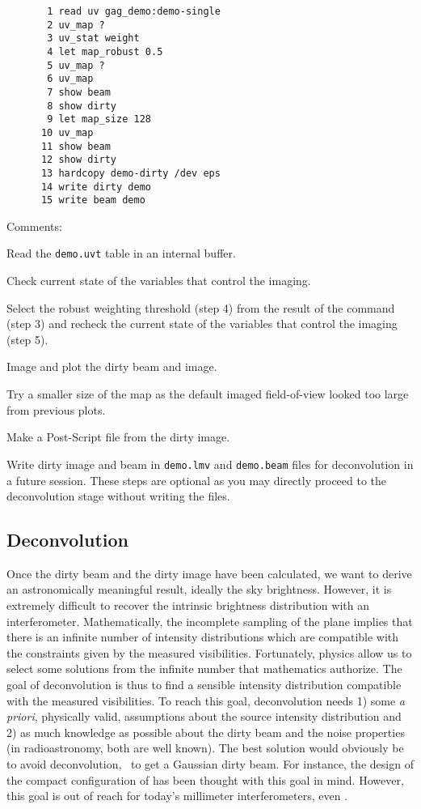 \begin{verbatim}
       1 read uv gag_demo:demo-single
       2 uv_map ?
       3 uv_stat weight
       4 let map_robust 0.5
       5 uv_map ?
       6 uv_map
       7 show beam
       8 show dirty
       9 let map_size 128
      10 uv_map
      11 show beam
      12 show dirty
      13 hardcopy demo-dirty /dev eps
      14 write dirty demo
      15 write beam demo
\end{verbatim}
Comments:
\begin{description}\itemsep 0pt
  \item[Step 1] Read the \texttt{demo.uvt} \uv{} table in an internal buffer.
  \item[Step 2] Check current state of the variables that control the 
  imaging.
  \item[Steps 3-5] Select the robust weighting threshold (step 4) from 
  the result of the  command (step 3) and recheck the 
  current state of the variables that control the imaging (step 5).
  \item[Steps 6-8] Image and plot the dirty beam and image.
  \item[Steps 9-12] Try a smaller size of the map as the default imaged 
  field-of-view looked too large from previous plots.
  \item[Steps 13] Make a Post-Script file from the dirty image.
  \item[Steps 14-15] Write dirty image and beam in \texttt{demo.lmv} 
  and \texttt{demo.beam} files for deconvolution in a future \imager{} 
  session. These steps are optional as you may directly proceed to the 
  deconvolution stage without writing the files.
\end{description}

\subsection{Deconvolution}
\label{sub:single:deconvolution}

Once the dirty beam and the dirty image have been calculated, we want to
derive an astronomically meaningful result, ideally the sky brightness.
However, it is extremely difficult to recover the intrinsic brightness
distribution with an interferometer. Mathematically, the
incomplete sampling of the \uv{} plane implies that there is an infinite
number of intensity distributions which are compatible with the constraints
given by the measured visibilities.  Fortunately, physics allow us to
select some solutions from the infinite number that mathematics authorize.
The goal of deconvolution is thus to find a sensible intensity distribution
compatible with the measured visibilities. To reach this goal,
deconvolution needs 1) some \emph{a priori}, physically valid, assumptions
about the source intensity distribution and 2) as much knowledge as
possible about the dirty beam and the noise properties (in radioastronomy,
both are well known). The best solution would obviously be to avoid
deconvolution, \ie\ to get a Gaussian dirty beam. For instance, the design
of the compact configuration of \ALMA{} has been thought with this goal in
mind. However, this goal is out of reach for today's millimeter
interferometers, even \ALMA{}.

